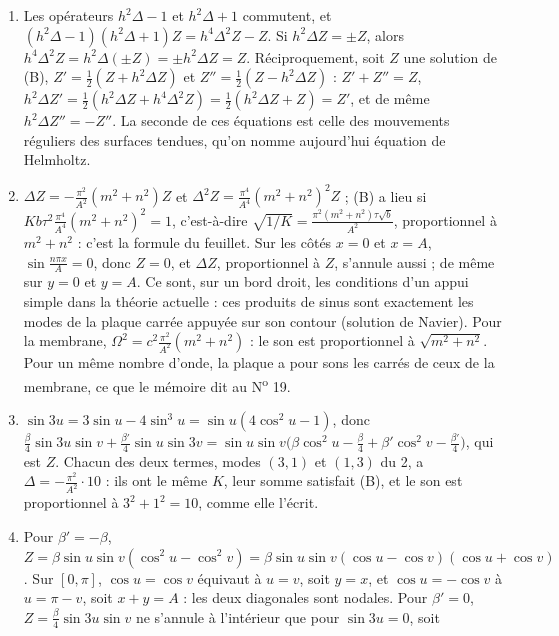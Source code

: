 \documentclass[11pt,a4paper]{article}
\begin{document}
\begin{solution}
\begin{enumerate}
\item Les opérateurs $h^2\Delta - 1$ et $h^2\Delta + 1$ commutent, et
  $(h^2\Delta - 1)(h^2\Delta + 1)Z = h^4\Delta^2Z - Z$. Si $h^2\Delta Z = \pm Z$, alors
  $h^4\Delta^2Z = h^2\Delta(\pm Z) = \pm h^2\Delta Z = Z$. Réciproquement, soit $Z$ une
  solution de (B), $Z' = \frac12(Z + h^2\Delta Z)$ et $Z'' = \frac12(Z - h^2\Delta Z)$ :
  $Z' + Z'' = Z$, $h^2\Delta Z' = \frac12(h^2\Delta Z + h^4\Delta^2Z) =
  \frac12(h^2\Delta Z + Z) = Z'$, et de même $h^2\Delta Z'' = -Z''$. La seconde de ces
  équations est celle des mouvements réguliers des surfaces tendues, qu'on nomme
  aujourd'hui équation de Helmholtz.
\item $\Delta Z = -\frac{\pi^2}{A^2}(m^2+n^2)Z$ et
  $\Delta^2Z = \frac{\pi^4}{A^4}(m^2+n^2)^2Z$ ; (B) a lieu si
  $Kb\tau^2\frac{\pi^4}{A^4}(m^2+n^2)^2 = 1$, c'est-à-dire
  $\sqrt{1/K} = \frac{\pi^2(m^2+n^2)\tau\sqrt b}{A^2}$, proportionnel à $m^2 + n^2$ :
  c'est la formule du feuillet. Sur les côtés $x = 0$ et $x = A$,
  $\sin\frac{n\pi x}{A} = 0$, donc $Z = 0$, et $\Delta Z$, proportionnel à $Z$, s'annule
  aussi ; de même sur $y = 0$ et $y = A$. Ce sont, sur un bord droit, les conditions
  d'un appui simple dans la théorie actuelle : ces produits de sinus sont exactement
  les modes de la plaque carrée appuyée sur son contour (solution de Navier). Pour la
  membrane, $\Omega^2 = c^2\frac{\pi^2}{A^2}(m^2+n^2)$ : le son est proportionnel à
  $\sqrt{m^2+n^2}$. Pour un même nombre d'onde, la plaque a pour sons les carrés de
  ceux de la membrane, ce que le mémoire dit au N\textsuperscript{o} 19.
\item $\sin3u = 3\sin u - 4\sin^3u = \sin u(4\cos^2u - 1)$, donc
  $\frac\beta4\sin3u\sin v + \frac{\beta'}4\sin u\sin3v =
  \sin u\sin v\bigl(\beta\cos^2u - \frac\beta4 + \beta'\cos^2v - \frac{\beta'}4\bigr)$,
  qui est $Z$. Chacun des deux termes, modes $(3,1)$ et $(1,3)$ du 2, a
  $\Delta = -\frac{\pi^2}{A^2}\cdot10$ : ils ont le même $K$, leur somme satisfait (B),
  et le son est proportionnel à $3^2 + 1^2 = 10$, comme elle l'écrit.
\item Pour $\beta' = -\beta$, $Z = \beta\sin u\sin v(\cos^2u - \cos^2v) =
  \beta\sin u\sin v(\cos u - \cos v)(\cos u + \cos v)$. Sur $[0,\pi]$, $\cos u = \cos v$
  équivaut à $u = v$, soit $y = x$, et $\cos u = -\cos v$ à $u = \pi - v$, soit
  $x + y = A$ : les deux diagonales sont nodales. Pour $\beta' = 0$,
  $Z = \frac\beta4\sin3u\sin v$ ne s'annule à l'intérieur que pour $\sin3u = 0$, soit

\end{enumerate}
\end{solution}
\end{document}
